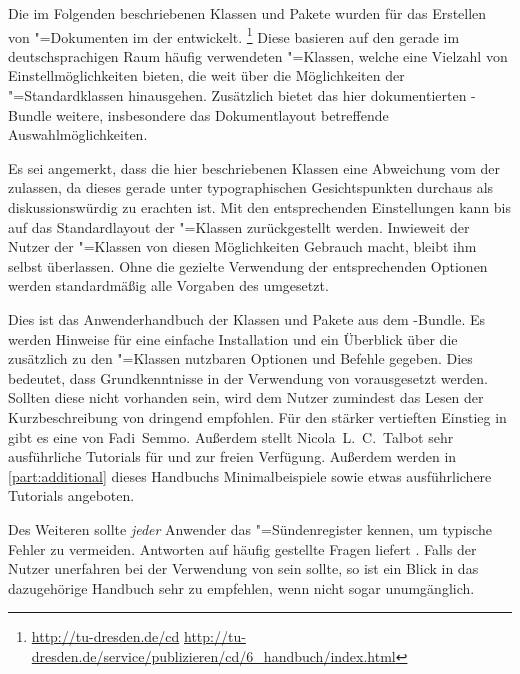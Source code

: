 \addchap{\prefacename}
Die im Folgenden beschriebenen Klassen und Pakete wurden für das Erstellen von 
"=Dokumenten im \CD der \TnUD entwickelt.%
\footnote{%
  \url{http://tu-dresden.de/cd}\hfill
  \url{http://tu-dresden.de/service/publizieren/cd/6_handbuch/index.html}%
}
Diese basieren auf den gerade im deutschsprachigen Raum häufig verwendeten 
\KOMAScript"=Klassen, welche eine Vielzahl von Einstellmöglichkeiten bieten, 
die weit über die Möglichkeiten der "=Standardklassen 
hinausgehen. Zusätzlich bietet das hier dokumentierten \TUDScript-Bundle 
weitere, insbesondere das Dokumentlayout betreffende Auswahlmöglichkeiten.

Es sei angemerkt, dass die hier beschriebenen Klassen eine Abweichung vom \CD 
der \TnUD zulassen, da dieses gerade unter typographischen Gesichtspunkten 
durchaus als diskussionswürdig zu erachten ist. Mit den entsprechenden 
Einstellungen kann bis auf das Standardlayout der \KOMAScript"=Klassen 
zurückgestellt werden. Inwieweit der Nutzer der \TUDScript"=Klassen von diesen 
Möglichkeiten Gebrauch macht, bleibt ihm selbst überlassen. Ohne die gezielte 
Verwendung der entsprechenden Optionen werden standardmäßig alle Vorgaben des 
\CDs umgesetzt.

Dies ist das Anwenderhandbuch der Klassen und Pakete aus dem \TUDScript-Bundle. 
Es werden Hinweise für eine einfache Installation und ein Überblick über die 
zusätzlich zu den \KOMAScript"=Klassen nutzbaren Optionen und Befehle gegeben. 
Dies bedeutet, dass Grundkenntnisse in der Verwendung von  
vorausgesetzt werden. Sollten diese nicht vorhanden sein, wird dem Nutzer 
zumindest das Lesen der Kurzbeschreibung von  
dringend empfohlen. Für den stärker vertieften Einstieg in  gibt 
es eine  von 
Fadi~Semmo. Außerdem stellt Nicola~L.~C.~Talbot sehr ausführliche Tutorials für 
 und 
 zur freien 
Verfügung. Außerdem werden in \autoref{part:additional} dieses Handbuchs 
Minimalbeispiele sowie etwas ausführlichere Tutorials angeboten.

Des Weiteren sollte \emph{jeder} Anwender das "=Sündenregister 
kennen, um typische Fehler zu vermeiden. Antworten auf häufig gestellte Fragen 
liefert . Falls der 
Nutzer unerfahren bei der Verwendung von \KOMAScript{} sein sollte, so ist ein 
Blick in das dazugehörige Handbuch \scrguide sehr zu empfehlen, wenn nicht 
sogar unumgänglich.

